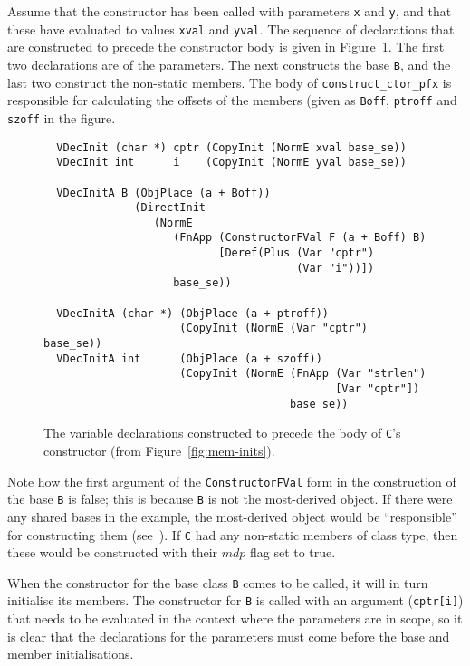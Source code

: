 \documentclass[11pt]{article}
\begin{document}
Assume that the constructor has been called with parameters \texttt{x}
and \texttt{y}, and that these have evaluated to values \texttt{xval}
and \texttt{yval}. The sequence of declarations that are constructed
to precede the constructor body is given in
Figure~\ref{fig:constructor-vdecs}. The first two declarations are of
the parameters.  The next constructs the base \texttt{B}, and the last
two construct the non-static members.  The body of
\texttt{construct_ctor_pfx} is responsible for calculating the offsets
of the members (given as \texttt{Boff}, \texttt{ptroff} and
\texttt{szoff} in the figure.

\begin{figure}[hbtp]
\begin{verbatim}
  VDecInit (char *) cptr (CopyInit (NormE xval base_se))
  VDecInit int      i    (CopyInit (NormE yval base_se))

  VDecInitA B (ObjPlace (a + Boff))
              (DirectInit
                 (NormE
                    (FnApp (ConstructorFVal F (a + Boff) B)
                           [Deref(Plus (Var "cptr")
                                       (Var "i"))])
                    base_se))

  VDecInitA (char *) (ObjPlace (a + ptroff))
                     (CopyInit (NormE (Var "cptr") base_se))
  VDecInitA int      (ObjPlace (a + szoff))
                     (CopyInit (NormE (FnApp (Var "strlen")
                                             [Var "cptr"])
                                      base_se))
\end{verbatim}
  \caption[Variable Declarations Generated from
  Figure~\ref{fig:mem-inits}]{The variable declarations constructed to
    precede the body of \texttt{C}'s constructor (from
    Figure~\ref{fig:mem-inits}).}
\label{fig:constructor-vdecs}
\end{figure}

Note how the first argument of the \texttt{ConstructorFVal} form in
the construction of the base \texttt{B} is false; this is because
\texttt{B} is not the most-derived object.  If there were any shared
bases in the example, the most-derived object would be ``responsible''
for constructing them (see~\cite[\S12.6.2, paragraph
5]{cpp-standard-iso14882}).  If \texttt{C} had any non-static members
of class type, then these would be constructed with their
$\mathit{mdp}$ flag set to true.

When the constructor for the base class \texttt{B} comes to be called,
it will in turn initialise its members.  The constructor for
\texttt{B} is called with an argument (\texttt{cptr[i]}) that needs to
be evaluated in the context where the parameters are in scope, so it
is clear that the declarations for the parameters must come before the
base and member initialisations.
\end{document}
